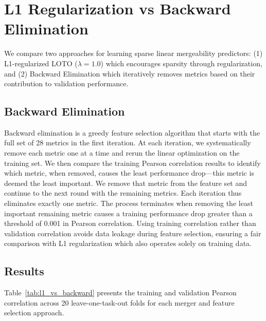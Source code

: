 \section{L1 Regularization vs Backward Elimination}
\label{sec:l1_vs_backward}

We compare two approaches for learning sparse linear mergeability predictors: (1) L1-regularized LOTO ($\lambda=1.0$) which encourages sparsity through regularization, and (2) Backward Elimination which iteratively removes metrics based on their contribution to validation performance.

\subsection{Backward Elimination}

Backward elimination is a greedy feature selection algorithm that starts with the full set of 28 metrics in the first iteration. At each iteration, we systematically remove each metric one at a time and rerun the linear optimization on the training set. We then compare the training Pearson correlation results to identify which metric, when removed, causes the least performance drop---this metric is deemed the least important. We remove that metric from the feature set and continue to the next round with the remaining metrics. Each iteration thus eliminates exactly one metric. The process terminates when removing the least important remaining metric causes a training performance drop greater than a threshold of 0.001 in Pearson correlation. Using training correlation rather than validation correlation avoids data leakage during feature selection, ensuring a fair comparison with L1 regularization which also operates solely on training data.

\subsection{Results}

Table~\ref{tab:l1_vs_backward} presents the training and validation Pearson correlation across 20 leave-one-task-out folds for each merger and feature selection approach.

